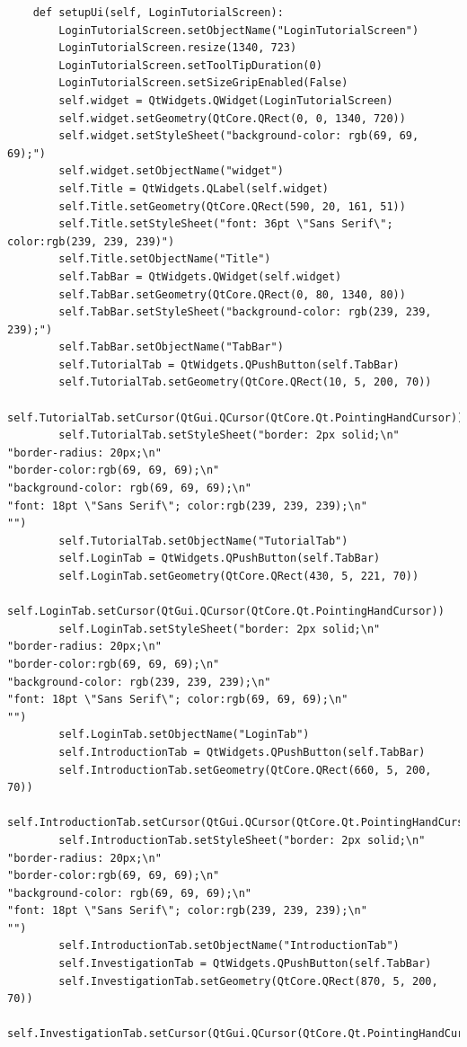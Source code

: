 \documentclass{article}
\begin{document}
\begin{lstlisting}
    def setupUi(self, LoginTutorialScreen):
        LoginTutorialScreen.setObjectName("LoginTutorialScreen")
        LoginTutorialScreen.resize(1340, 723)
        LoginTutorialScreen.setToolTipDuration(0)
        LoginTutorialScreen.setSizeGripEnabled(False)
        self.widget = QtWidgets.QWidget(LoginTutorialScreen)
        self.widget.setGeometry(QtCore.QRect(0, 0, 1340, 720))
        self.widget.setStyleSheet("background-color: rgb(69, 69, 69);")
        self.widget.setObjectName("widget")
        self.Title = QtWidgets.QLabel(self.widget)
        self.Title.setGeometry(QtCore.QRect(590, 20, 161, 51))
        self.Title.setStyleSheet("font: 36pt \"Sans Serif\"; color:rgb(239, 239, 239)")
        self.Title.setObjectName("Title")
        self.TabBar = QtWidgets.QWidget(self.widget)
        self.TabBar.setGeometry(QtCore.QRect(0, 80, 1340, 80))
        self.TabBar.setStyleSheet("background-color: rgb(239, 239, 239);")
        self.TabBar.setObjectName("TabBar")
        self.TutorialTab = QtWidgets.QPushButton(self.TabBar)
        self.TutorialTab.setGeometry(QtCore.QRect(10, 5, 200, 70))
        self.TutorialTab.setCursor(QtGui.QCursor(QtCore.Qt.PointingHandCursor))
        self.TutorialTab.setStyleSheet("border: 2px solid;\n"
"border-radius: 20px;\n"
"border-color:rgb(69, 69, 69);\n"
"background-color: rgb(69, 69, 69);\n"
"font: 18pt \"Sans Serif\"; color:rgb(239, 239, 239);\n"
"")
        self.TutorialTab.setObjectName("TutorialTab")
        self.LoginTab = QtWidgets.QPushButton(self.TabBar)
        self.LoginTab.setGeometry(QtCore.QRect(430, 5, 221, 70))
        self.LoginTab.setCursor(QtGui.QCursor(QtCore.Qt.PointingHandCursor))
        self.LoginTab.setStyleSheet("border: 2px solid;\n"
"border-radius: 20px;\n"
"border-color:rgb(69, 69, 69);\n"
"background-color: rgb(239, 239, 239);\n"
"font: 18pt \"Sans Serif\"; color:rgb(69, 69, 69);\n"
"")
        self.LoginTab.setObjectName("LoginTab")
        self.IntroductionTab = QtWidgets.QPushButton(self.TabBar)
        self.IntroductionTab.setGeometry(QtCore.QRect(660, 5, 200, 70))
        self.IntroductionTab.setCursor(QtGui.QCursor(QtCore.Qt.PointingHandCursor))
        self.IntroductionTab.setStyleSheet("border: 2px solid;\n"
"border-radius: 20px;\n"
"border-color:rgb(69, 69, 69);\n"
"background-color: rgb(69, 69, 69);\n"
"font: 18pt \"Sans Serif\"; color:rgb(239, 239, 239);\n"
"")
        self.IntroductionTab.setObjectName("IntroductionTab")
        self.InvestigationTab = QtWidgets.QPushButton(self.TabBar)
        self.InvestigationTab.setGeometry(QtCore.QRect(870, 5, 200, 70))
        self.InvestigationTab.setCursor(QtGui.QCursor(QtCore.Qt.PointingHandCursor))

\end{lstlisting}
\end{document}
